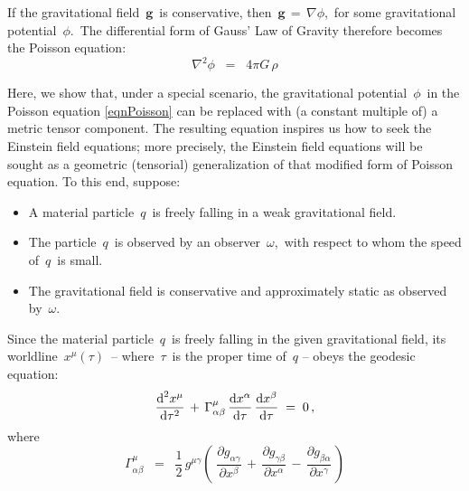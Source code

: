 \vskip 0.3cm
\noindent
If the gravitational field \,$\mathbf{g}$\, is conservative, then
\,$\mathbf{g} \,=\, \nabla \phi$,\,
for some gravitational potential \,$\phi$.\,
The differential form of Gauss' Law of Gravity therefore becomes the Poisson equation:
\begin{equation}\label{eqnPoisson}
\nabla^{2}\phi \;\; = \;\; 4 \pi G \, \rho
\end{equation}


\vskip 0.3cm
\begin{remark}
\label{remarkPoissonWithMetricComponent}
\mbox{}
\vskip 0.1cm
\noindent
Here, we show that, under a special scenario, the gravitational potential \,$\phi$\,
in the Poisson equation \eqref{eqnPoisson} can be replaced
with (a constant multiple of) a metric tensor component.
The resulting equation inspires us how to seek the Einstein field equations;
more precisely, the Einstein field equations will be sought as a geometric (tensorial) generalization
of that modified form of Poisson equation.
To this end, suppose:
\begin{itemize}
\item
	A material particle \,$q$\, is freely falling in a {\color{red}weak} gravitational field.
\item
	The particle \,$q$\, is observed by an observer \,$\omega$,\,
	with respect to whom the speed of \,$q$\, is small.
\item
	The gravitational field is {\color{red}conservative} and {\color{red}approximately static}
	as observed by \,$\omega$.
\end{itemize}
Since the material particle \,$q$\, is freely falling in the given gravitational field,
its worldline \,$x^{\mu}(\tau)$\, -- where \,$\tau$\, is the proper time of \,$q$ --
obeys the geodesic equation:
\begin{equation*}
\dfrac{\textnormal{d}^{2}x^{\mu}}{\textnormal{d}\tau^{2}}
\,+\,
\Gamma^{\mu}_{\alpha\beta}\,\dfrac{\textnormal{d} x^{\alpha}}{\textnormal{d}\tau}\,\dfrac{\textnormal{d} x^{\beta}}{\textnormal{d}\tau}
\; = \;
	0\,,
\end{equation*}
where
\begin{equation*}
\Gamma^{\mu}_{\alpha\beta}
\;\; = \;\;
	\dfrac{1}{2}\,g^{\mu\gamma}\left(\;
		\dfrac{\partial g_{\alpha\gamma}}{\partial x^{\beta}}
		\,+\,
		\dfrac{\partial g_{\gamma\beta}}{\partial x^{\alpha}}
		\,-\,
		\dfrac{\partial g_{\beta\alpha}}{\partial x^{\gamma}}
		\,\right)
\end{equation*}

\end{remark}
